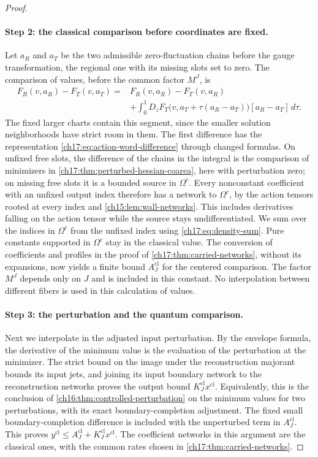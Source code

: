 \begin{proof}
\paragraph{Step 2: the classical comparison before coordinates are fixed.}
Let $a_R$ and $a_T$ be the two admissible zero-fluctuation chains before the gauge transformation, the regional one with its missing slots set to zero. The comparison of values, before the common factor $M^J$, is
\begin{align*}
 F_R(v,a_R)-F_T(v,a_T)={}&F_R(v,a_R)-F_T(v,a_R)\\
 &+\int_0^1D_zF_T\bigl(v,a_T+\tau(a_R-a_T)\bigr)[a_R-a_T]\,d\tau.
\end{align*}
The fixed larger charts contain this segment, since the smaller solution neighborhoods have strict room in them. The first difference has the representation \eqref{ch17:eq:action-word-difference} through changed formulas. On unfixed free slots, the difference of the chains in the integral is the comparison of minimizers in \cref{ch17:thm:perturbed-hessian-coarea}, here with perturbation zero; on missing free slots it is a bounded source in $\Omega^c$. Every nonconstant coefficient with an unfixed output index therefore has a network to $\Omega^c$, by the action tensors rooted at every index and \cref{ch15:lem:wall-networks}. This includes derivatives falling on the action tensor while the source stays undifferentiated. We sum over the indices in $\Omega^c$ from the unfixed index using \eqref{ch17:eq:density-sum}. Pure constants supported in $\Omega^c$ stay in the classical value. The conversion of coefficients and profiles in the proof of \cref{ch17:thm:carried-networks}, without its expansions, now yields a finite bound $A_J^{\mathrm{cl}}$ for the centered comparison. The factor $M^J$ depends only on $J$ and is included in this constant. No interpolation between different fibers is used in this calculation of values.

\paragraph{Step 3: the perturbation and the quantum comparison.}
Next we interpolate in the adjusted input perturbation. By the envelope formula, the derivative of the minimum value is the evaluation of the perturbation at the minimizer. The strict bound on the image under the reconstruction majorant bounds its input jets, and joining its input boundary network to the reconstruction networks proves the output bound $K_J^{\mathrm{cl}}x^{\mathrm{cl}}$. Equivalently, this is the conclusion of \cref{ch16:thm:controlled-perturbation} on the minimum values for two perturbations, with its exact boundary-completion adjustment. The fixed small boundary-completion difference is included with the unperturbed term in $A_J^{\mathrm{cl}}$. This proves $y^{\mathrm{cl}}\le A_J^{\mathrm{cl}}+K_J^{\mathrm{cl}}x^{\mathrm{cl}}$. The coefficient networks in this argument are the classical ones, with the common rates chosen in \cref{ch17:thm:carried-networks}.


\end{proof}
